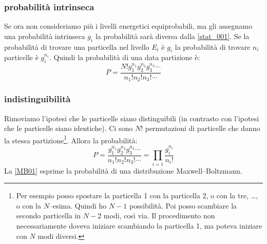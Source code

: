 \subsubsection{probabilità intrinseca}
Se ora non consideriamo più i livelli energetici equiprobabili, ma gli assegnamo una probabilità intrinseca $g_i$ la probabilità sarà diversa dalla \eqref{stat_001}. Se la probabilità di trovare una particella nel livello $E_i$ è $g_i$ la probabilità di trovare $n_i$ particelle è $g_i^{n_i}$. Quindi la probabilità di una data partizione è:
\begin{equation}
P=\frac{N!g_1^{n_1}g_2^{n_2}g_3^{n_3}\cdots}{n_1!n_2!n_3!\cdots}
\end{equation}
\subsubsection{indistinguibilità}
Rimoviamo l'ipotesi che le particelle siano distinguibili (in contrasto con l'ipotesi che le particelle siano identiche). Ci sono $N!$ permutazioni di particelle che danno la stessa partizione\footnote{Per esempio posso spostare la particella 1 con la particella 2, o con la tre, \ldots, o con la $N$--esima. Quindi ho $N-1$ possibilità. Poi posso scambiare la secondo particella in $N-2$ modi, così via. Il procedimento non necessariamente doveva iniziare scambiando la particella 1, ma poteva iniziare con $N$ modi diversi.}. Allora la probabilità:
\begin{equation}
P=\frac{g_1^{n_1}g_2^{n_2}g_3^{n_3}\cdots}{n_1!n_2!n_3!\cdots}=\prod_{i=1}\frac{g_i^{n_i}}{n_i!}
\label{MB01}
\end{equation}
La \eqref{MB01} esprime la probabilità di una distribuzione Maxwell--Boltzmann.
